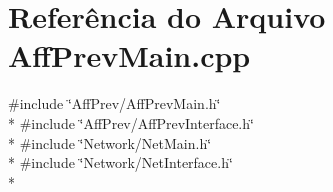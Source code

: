 \section{Referência do Arquivo Aff\+Prev\+Main.\+cpp}
\label{_aff_prev_main_8cpp}
{\ttfamily \#include \char`\"{}Aff\+Prev/\+Aff\+Prev\+Main.\+h\char`\"{}}\\*
{\ttfamily \#include \char`\"{}Aff\+Prev/\+Aff\+Prev\+Interface.\+h\char`\"{}}\\*
{\ttfamily \#include \char`\"{}Network/\+Net\+Main.\+h\char`\"{}}\\*
{\ttfamily \#include \char`\"{}Network/\+Net\+Interface.\+h\char`\"{}}\\*
